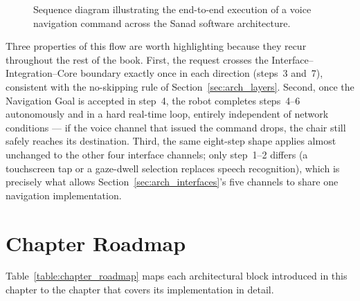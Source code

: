 \begin{figure}[H]

\caption{Sequence diagram illustrating the end-to-end execution of a voice navigation command across the Sanad software architecture.}
\label{fig:e2e_flow}
\end{figure}

Three properties of this flow are worth highlighting because they recur throughout the rest of the book. First, the request crosses the Interface--Integration--Core boundary exactly once in each direction (steps~3 and~7), consistent with the no-skipping rule of Section~\ref{sec:arch_layers}. Second, once the Navigation Goal is accepted in step~4, the robot completes steps~4--6 autonomously and in a hard real-time loop, entirely independent of network conditions --- if the voice channel that issued the command drops, the chair still safely reaches its destination. Third, the same eight-step shape applies almost unchanged to the other four interface channels; only step~1--2 differs (a touchscreen tap or a gaze-dwell selection replaces speech recognition), which is precisely what allows Section~\ref{sec:arch_interfaces}'s five channels to share one navigation implementation.

\section{Chapter Roadmap}
\label{sec:arch_roadmap}

Table~\ref{table:chapter_roadmap} maps each architectural block introduced in this chapter to the chapter that covers its implementation in detail.

